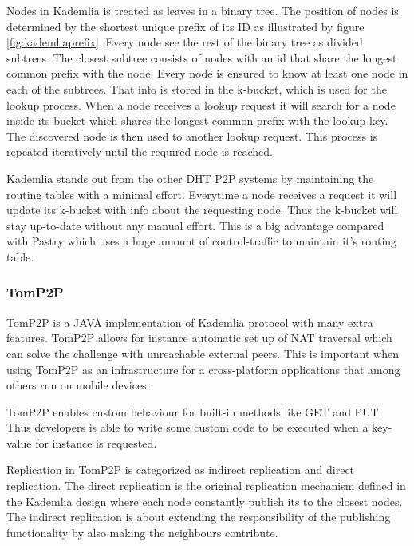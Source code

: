 Nodes in Kademlia is treated as leaves in a binary tree. The position of nodes is determined by the shortest unique prefix of its ID as illustrated by figure \ref{fig:kademliaprefix}. Every node see the rest of the binary tree as divided subtrees. The closest subtree consists of nodes with an id that share the longest common prefix with the node. Every node is ensured to know at least one node in each of the subtrees. That info is stored in the k-bucket, which is used for the lookup process. When a node receives a lookup request it will search for a node inside its bucket which shares the longest common prefix with the lookup-key. The discovered node is then used to another lookup request. This process is repeated iteratively until the required node is reached.

Kademlia stands out from the other DHT P2P systems by maintaining the routing tables with a minimal effort. Everytime a node receives a request it will update its k-bucket with info about the requesting node. Thus the k-bucket will stay up-to-date without any manual effort. This is a big advantage compared with Pastry which uses a huge amount of control-traffic to maintain it's routing table.



\subsubsection{TomP2P}
TomP2P is a JAVA implementation of Kademlia protocol with many extra features. TomP2P allows for instance automatic set up of NAT traversal which can solve the challenge with unreachable external peers. This is important when using TomP2P as an infrastructure for a cross-platform applications that among others run on mobile devices.

 TomP2P enables custom behaviour for built-in methods like GET and PUT. Thus developers is able to write some custom code to be executed when a key-value for instance is requested.

Replication in TomP2P is categorized as indirect replication and direct replication. The direct replication is the original replication mechanism defined in the Kademlia design where each node constantly publish its to the closest nodes. The indirect replication is about extending the responsibility of the publishing functionality by also making the neighbours contribute.
    
